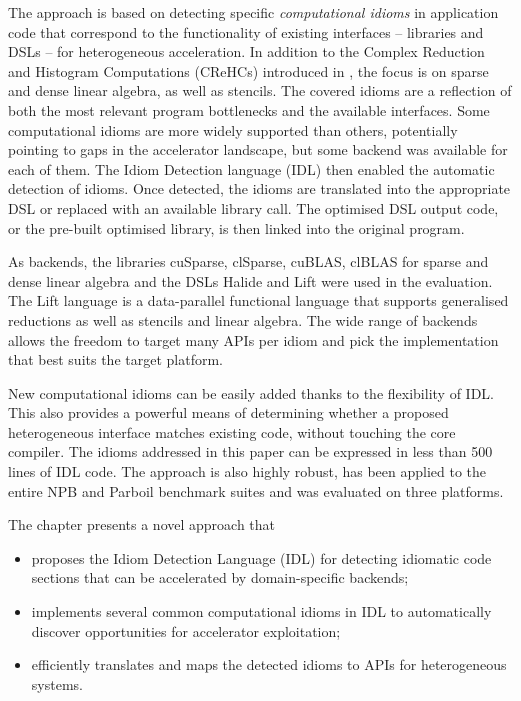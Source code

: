     The approach is based on detecting specific {\em computational idioms} in
    application code that correspond to the functionality of existing interfaces
    -- libraries and DSLs -- for heterogeneous acceleration.
    In addition to the Complex Reduction and Histogram Computations (CReHCs)
    introduced in , the focus is on
    sparse and dense linear algebra, as well as stencils.
    The covered idioms are a reflection of both the most relevant program
    bottlenecks and the available interfaces.
    Some computational idioms are more widely supported than others, potentially
    pointing to gaps in the accelerator landscape, but some backend was
    available for each of them.
    The Idiom Detection language (IDL) then enabled the automatic detection of
    idioms.
    Once detected, the idioms are translated into the appropriate DSL or
    replaced with an available library call.
    The optimised DSL output code, or the pre-built optimised library, is then
    linked into the original program.

    As backends, the libraries cuSparse, clSparse, cuBLAS, clBLAS for
    sparse and dense linear algebra and the DSLs Halide
    \cite{Ragan-Kelley2013Halide} and Lift \cite{SteuwerRD17} were used in the
    evaluation.
    The Lift language is a data-parallel functional language that supports
    generalised reductions as well as stencils and linear algebra.
    The wide range of backends allows the freedom to target many APIs per idiom
    and pick the implementation that best suits the target platform.

    New computational idioms can be easily added thanks to the flexibility of IDL.
    This also provides a powerful means of determining whether a proposed
    heterogeneous interface matches existing code, without touching the core
    compiler.
    The idioms addressed in this paper can be expressed in less than 500 lines
    of IDL code.
    The approach is also highly robust, has been applied to the entire NPB
    and Parboil benchmark suites and was evaluated on three platforms.

    The chapter presents a novel approach that
    \begin{itemize}
    \item proposes the Idiom Detection Language (IDL) for detecting idiomatic
          code sections that can be accelerated by domain-specific backends;
    \item implements several common computational idioms in IDL to automatically
          discover opportunities for accelerator exploitation;
    \item efficiently translates and maps the detected idioms to APIs for
          heterogeneous systems.
    \end{itemize}

